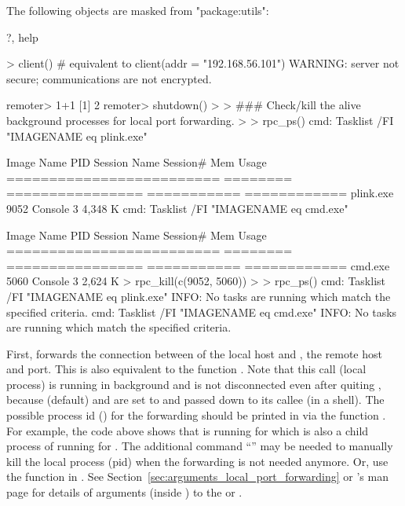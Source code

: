 \begin{Code}[title=Forward \code{localhost:55555} to \code{192.168.56.101:55555}]
The following objects are masked from "package:utils":

    ?, help

> client()    # equivalent to client(addr = "192.168.56.101")
WARNING: server not secure; communications are not encrypted.

remoter> 1+1
[1] 2 
remoter> shutdown()
>
> ### Check/kill the alive background processes for local port forwarding.
>
> rpc_ps()
cmd: Tasklist /FI "IMAGENAME eq plink.exe"

Image Name                     PID Session Name        Session#    Mem Usage
========================= ======== ================ =========== ============
plink.exe                     9052 Console                    3      4,348 K
cmd: Tasklist /FI "IMAGENAME eq cmd.exe"

Image Name                     PID Session Name        Session#    Mem Usage
========================= ======== ================ =========== ============
cmd.exe                       5060 Console                    3      2,624 K
> rpc_kill(c(9052, 5060))
>
> rpc_ps()
cmd: Tasklist /FI "IMAGENAME eq plink.exe"
INFO: No tasks are running which match the specified criteria.
cmd: Tasklist /FI "IMAGENAME eq cmd.exe"
INFO: No tasks are running which match the specified criteria.
\end{Code}

First, 
forwards the connection between  of the local host and
, the remote host and port.
This is also equivalent to the function .
Note that this call (local process) is running in background and is
not disconnected even after quiting ,
because  (default) and {\color{red} }
are set to  and passed down to its callee (in a shell).
The possible process id () for the forwarding
should be printed in  via the function .
For example, the code above shows that  is running
for  which is also a child process of 
running for .
{\color{red}
The additional command ``'' may be needed to manually
kill the local process (pid) when the forwarding is not needed anymore.
Or, use the function  in .
}
See Section~\ref{sec:arguments_local_port_forwarding} or
's man page for details of arguments 
(inside ) to the  or .

